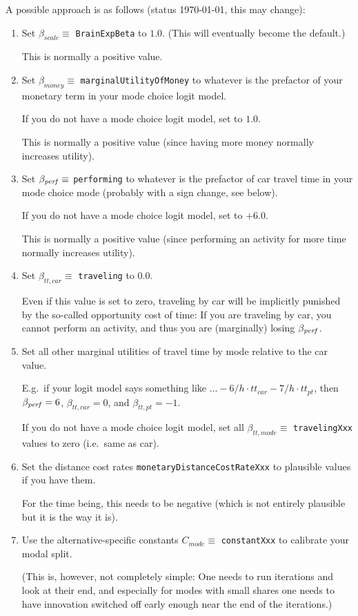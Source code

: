 A possible approach is as follows (status \today, this may change):
\begin{enumerate}

\item Set $\beta_{scale} \equiv$ \verb$BrainExpBeta$ to $1.0$.  (This will eventually become the default.)

This is normally a positive value.

\item Set $\beta_{money} \equiv$ \verb$marginalUtilityOfMoney$ to whatever is the prefactor of your monetary term in your mode choice logit model.

If you do not have a mode choice logit model, set to $1.0$. 

This is normally a positive value (since having more money normally increases utility).

\item Set $\beta_{\it perf} \equiv$ \verb$performing$ to whatever is the prefactor of car travel time in your mode choice mode (probably with a sign change, see below).

If you do not have a mode choice logit model, set to $+6.0$.

This is normally a positive value (since performing an activity for more time normally increases utility).

\item Set $\beta_{tt,car} \equiv$ \verb$traveling$ to $0.0$.

  Even if this value is set to zero, traveling by car will be implicitly punished by the so-called opportunity cost of time: If you are traveling by car, you cannot perform an activity, and thus you are (marginally) losing $\beta_{\it perf}$.

\item Set all other marginal utilities of travel time by mode relative to the car value.

E.g.\ if your logit model says something like $... -6/h \cdot tt_{car} - 7/h \cdot tt_{pt}$, then $\beta_{\it perf} = 6$, $\beta_{tt,car} = 0$, and $\beta_{tt,pt} = -1$.

If you do not have a mode choice logit model, set all $\beta_{tt,mode} \equiv$ \verb$travelingXxx$ values to zero (i.e.\ same as car).

\item Set the distance cost rates \verb$monetaryDistanceCostRateXxx$ to plausible values if you have them.

For the time being, this needs to be negative (which is not entirely plausible but it is the way it is).

\item Use the alternative-specific constants $C_{mode} \equiv$ \verb$constantXxx$ to calibrate your modal split.

(This is, however, not completely simple: One needs to run iterations and look at their end, and especially for modes with small shares one needs to have innovation switched off early enough near the end of the iterations.)

\end{enumerate}

